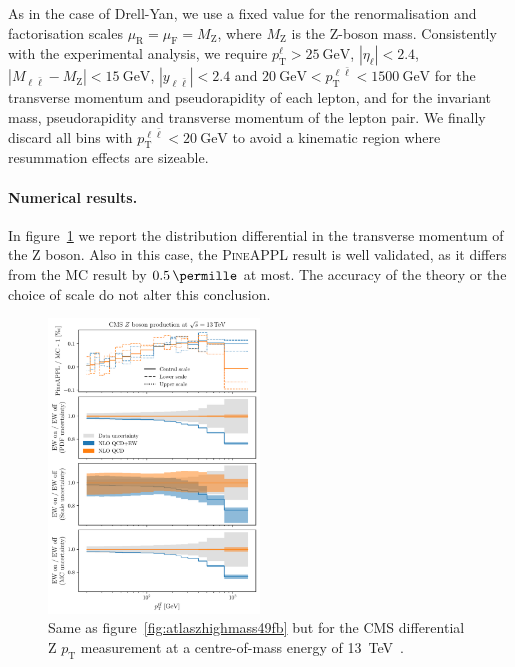 As in the case of Drell-Yan, we use a fixed value for the renormalisation and
factorisation scales $\mu_\mathrm{R}=\mu_\mathrm{F}=M_\mathrm{Z}$, where
$M_\mathrm{Z}$ is the Z-boson mass. Consistently with the
experimental analysis, we require $p_\mathrm{T}^\ell>\SI{25}{\giga\electronvolt}$,
$|\eta_\ell|<2.4$, $|M_{\ell\bar\ell} - M_\mathrm{Z}| < \SI{15}{\giga\electronvolt}$,
$|y_{\ell\bar\ell}|<2.4$ and $\SI{20}{\giga\electronvolt}<p_\mathrm{T}^{\ell\bar\ell}<\SI{1500}{\giga\electronvolt}$ for the
transverse momentum and pseudorapidity of each lepton, and for the invariant
mass, pseudorapidity and transverse momentum of the lepton pair.
We finally discard all bins with
$p_\mathrm{T}^{\ell \bar{\ell}}<\SI{20}{\giga\electronvolt}$ to avoid a kinematic
region where resummation effects are sizeable.

\paragraph{Numerical results.} In figure~\ref{fig:cmsZ13TeV} we report the
distribution differential in the transverse momentum of the Z
boson. Also in this case, the \textsc{PineAPPL} result is well validated, as it
differs from the MC result by $\SI{0.5}{\permille}$ at most. The accuracy of the
theory or the choice of scale do not alter this conclusion.

\begin{figure}[!t]
    \centering
    \includegraphics[width=0.5\textwidth]{figures/pineappl_CMS_Z_13_TEV}
    \caption{Same as figure~\ref{fig:atlaszhighmass49fb} but for the 
      CMS differential Z $p_\mathrm{T}$ measurement at a centre-of-mass energy of
      \SI{13}{\tera\electronvolt}~\cite{Sirunyan:2019bzr}.}
    \label{fig:cmsZ13TeV}
\end{figure}

